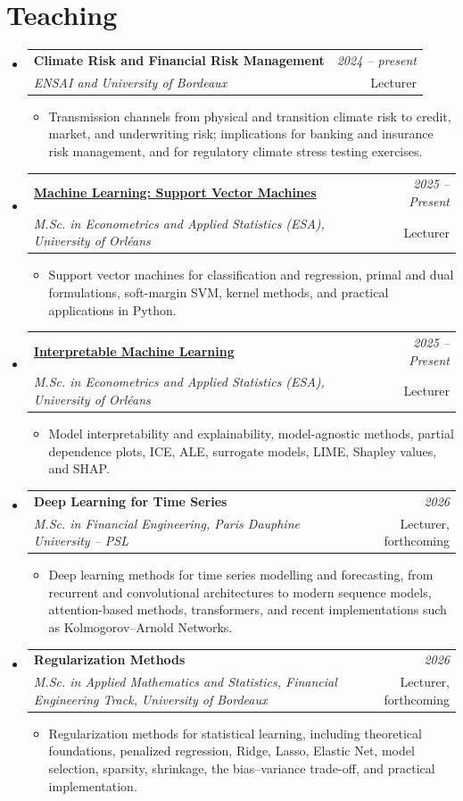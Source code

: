 \documentclass[a4paper,11pt]{article}
\newcommand{\resumeProject}[4]{
\vspace{0.5mm}\item
    \begin{tabularx}{0.98\textwidth}[t]{X r}
        \textbf{#1} & \textit{\footnotesize{#3}} \\
        \footnotesize{\textit{#2}} & \footnotesize{#4}
    \end{tabularx}
    \vspace{-2.4mm}
}
\newcommand{\resumeSubHeadingListStart}{\begin{itemize}[leftmargin=*,labelsep=1mm]}
\newcommand{\resumeItemListStart}{\begin{itemize}[leftmargin=*,labelsep=1mm,itemsep=0.5mm]\small}
\newcommand{\resumeSubHeadingListEnd}{\end{itemize}\vspace{2mm}}
\newcommand{\resumeItemListEnd}{\end{itemize}\vspace{-2mm}}
\begin{document}
\section{\textbf{Teaching}}
\vspace{-0.4mm}
\resumeSubHeadingListStart
\resumeProject
  {Climate Risk and Financial Risk Management}
  {ENSAI and University of Bordeaux}
  {2024 -- present}
  {Lecturer}
\resumeItemListStart
\item Transmission channels from physical and transition climate risk to credit, market, and underwriting risk; implications for banking and insurance risk management, and for regulatory climate stress testing exercises.
\resumeItemListEnd
\resumeProject
  {\href{https://yoannpull.github.io/mywebsite/teaching/courses/SVM_Course_en.pdf}{Machine Learning: Support Vector Machines}}
  {M.Sc. in Econometrics and Applied Statistics (ESA), University of Orléans}
  {2025 -- Present}
  {Lecturer}
\resumeItemListStart
\item Support vector machines for classification and regression, primal and dual formulations, soft-margin SVM, kernel methods, and practical applications in Python.
\resumeItemListEnd
\resumeProject
  {\href{https://yoannpull.github.io/mywebsite/teaching/slides/Master\%20ESA\%202025\%20-\%20Interpretable\%20Machine\%20Learning.pdf}{Interpretable Machine Learning}}
  {M.Sc. in Econometrics and Applied Statistics (ESA), University of Orléans}
  {2025 -- Present}
  {Lecturer}
\resumeItemListStart
\item Model interpretability and explainability, model-agnostic methods, partial dependence plots, ICE, ALE, surrogate models, LIME, Shapley values, and SHAP.
\resumeItemListEnd
\resumeProject
  {Deep Learning for Time Series}
  {M.Sc. in Financial Engineering, Paris Dauphine University -- PSL}
  {2026}
  {Lecturer, forthcoming}
\resumeItemListStart
\item Deep learning methods for time series modelling and forecasting, from recurrent and convolutional architectures to modern sequence models, attention-based methods, transformers, and recent implementations such as Kolmogorov--Arnold Networks.
\resumeItemListEnd
\resumeProject
  {Regularization Methods}
  {M.Sc. in Applied Mathematics and Statistics, Financial Engineering Track, University of Bordeaux}
  {2026}
  {Lecturer, forthcoming}
\resumeItemListStart
\item Regularization methods for statistical learning, including theoretical foundations, penalized regression, Ridge, Lasso, Elastic Net, model selection, sparsity, shrinkage, the bias--variance trade-off, and practical implementation.
\resumeItemListEnd
\resumeSubHeadingListEnd
\vspace{-6mm}
\end{document}
